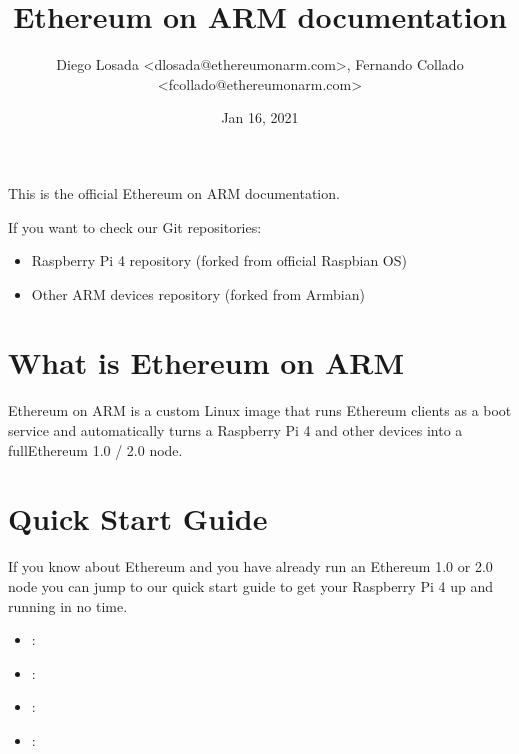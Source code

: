 \documentclass[letterpaper,10pt,english]{sphinxmanual}
\title{Ethereum on ARM documentation}
\date{Jan 16, 2021}
\author{Diego Losada \textless{}dlosada@ethereumonarm.com\textgreater{}, Fernando Collado \textless{}fcollado@ethereumonarm.com\textgreater{}}
\begin{document}
\pagestyle{empty}
\sphinxmaketitle
\pagestyle{plain}
\sphinxtableofcontents
\pagestyle{normal}
\label{\detokenize{index::doc}}


This is the official Ethereum on ARM documentation.

If you want to check our Git repositories:
\begin{itemize}
\item {} 
 Raspberry Pi 4 repository (forked from official Raspbian OS)

\item {} 
 Other ARM devices repository (forked from Armbian)

\end{itemize}


\chapter{What is Ethereum on ARM}
\label{\detokenize{index:what-is-ethereum-on-arm}}
Ethereum on ARM is a custom Linux image
that runs Ethereum clients as a boot service
and automatically turns a Raspberry Pi 4 and other
devices into a fullEthereum 1.0 / 2.0 node.


\chapter{Quick Start Guide}
\label{\detokenize{index:quick-start-guide}}
If you know about Ethereum and you have already run an Ethereum 1.0
or 2.0 node you can jump to our quick start guide to get your
Raspberry Pi 4 up and running in no time.
\begin{itemize}
\item {} 
:
{\hyperref[\detokenize{quick-guide/what-you-need::doc}]{}}

\item {} 
:
{\hyperref[\detokenize{quick-guide/download-and-install::doc}]{}}

\item {} 
:
{\hyperref[\detokenize{quick-guide/ethereum-clients::doc}]{}}

\item {} 
:
{\hyperref[\detokenize{quick-guide/whats-next::doc}]{}}

\end{itemize}
\end{document}
